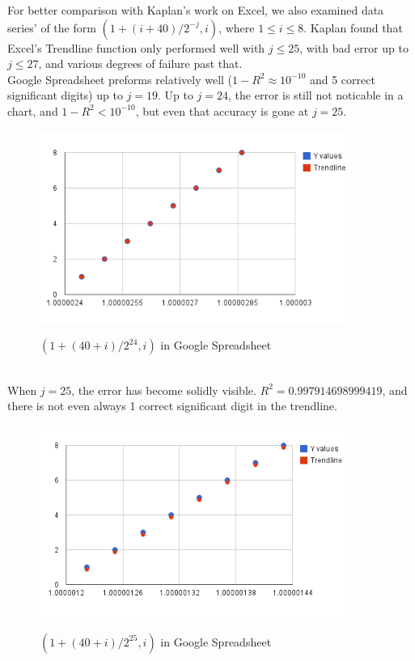 \documentclass{article}
\begin{document}
For better comparison with Kaplan's work on Excel, we also examined data series'
of the form ${(1 + (i + 40)/2^{-j}, i)}$, where $1\le i \le 8$.
Kaplan found that Excel's Trendline function only performed well with $j \le 25$,
with bad error up to $j \le 27$, and various degrees of failure past that.\\
Google Spreadsheet preforms relatively well
($1- R^2 \approx 10^{-10}$ and 5 correct significant digits) up to $j=19$.
Up to $j=24$, the error is still not noticable in a chart, and $1-R^2 < 10^{-10}$,
but even that accuracy is gone at $j=25$.\\
\begin{figure}[h!]
  \caption{${(1 + (40 + i)/2^{24}, i)}$ in Google Spreadsheet}
  \centering
\includegraphics[width=4in]{TREND2j24.png}\\
\end{figure}\\

When $j=25$, the error has become solidly visible.  $R^2 = 0.997914698999419$, and there is
not even always 1 correct significant digit in the trendline.\\
\begin{figure}[h!]
  \caption{${(1 + (40 + i)/2^{25}, i)}$ in Google Spreadsheet}
  \centering
\includegraphics[width=4in]{TREND2j25.png}\\
\end{figure}\\
\end{document}

